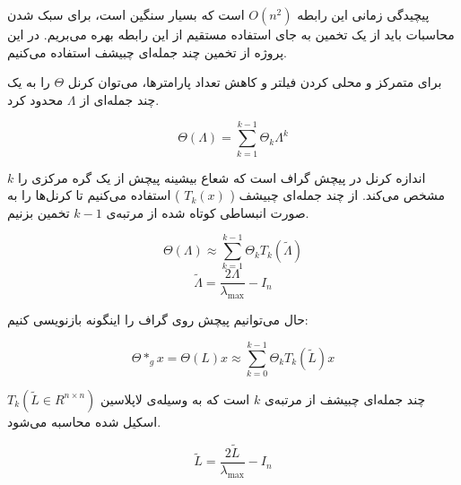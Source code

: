 پیچیدگی زمانی این رابطه $O(n^{2})$ است که بسیار سنگین است، برای سبک شدن محاسبات باید از یک تخمین به جای استفاده مستقیم از این رابطه بهره می‌بریم.
در این پروژه از تخمین چند جمله‌ای چبیشف استفاده می‌کنیم.

برای متمرکز و محلی کردن فیلتر و کاهش تعداد پارامترها، می‌توان کرنل $\Theta$ را به یک چند جمله‌ای از $\varLambda$ محدود کرد.

\[
  \Theta(\varLambda) = \sum_{k=1}^{k-1}\Theta_{k}\varLambda^{k}
\]

$k$ اندازه کرنل در پیچش گراف است که شعاع بیشینه پیچش از یک گره مرکزی را مشخص می‌کند. از چند جمله‌ای چبیشف ( $T_{k}(x)$ ) استفاده می‌کنیم تا کرنل‌ها را به صورت انبساطی کوتاه شده از مرتبه‌ی $k-1$ تخمین بزنیم.

\[
  \Theta(\varLambda) \approx \sum_{k=1}^{k-1}\Theta_{k}T_{k}(\widetilde{\varLambda})
\]
\[
  \widetilde{\varLambda} = \frac{2\varLambda}{\lambda_{\max}} - I_{n}
\]


حال می‌توانیم پیچش روی گراف را اینگونه بازنویسی کنیم:

\begin{equation}
  \Theta \ast_{g} x = \Theta(L)x \approx \sum_{k=0}^{k-1} \Theta_{k} T_{k}(\widetilde{L})x
  \label{eq:approx-convolution}
\end{equation}

$T_{k}(\widetilde{L} \in R^{n \times n})$ چند جمله‌ای چبیشف از مرتبه‌ی $k$ است که به وسیله‌ی لاپلاسین اسکیل شده محاسبه می‌شود.

\[
  \widetilde{L} = \frac{2\widetilde{L}}{\lambda_{\max}} - I_{n}
\]

